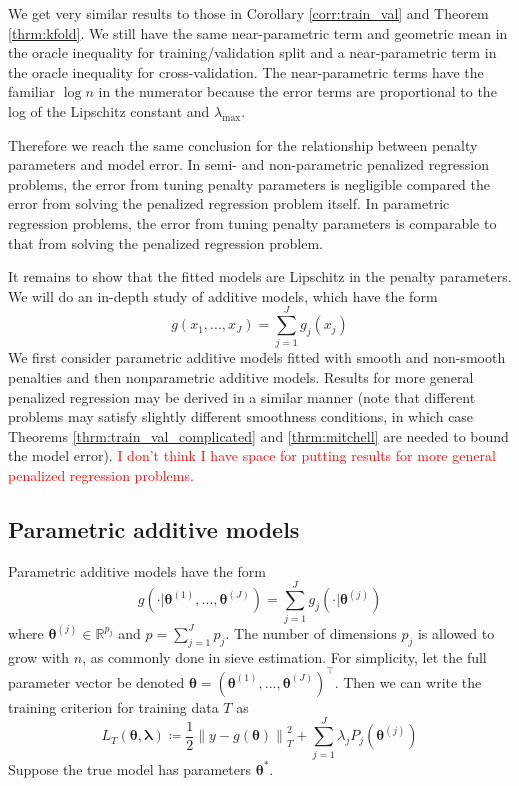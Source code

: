 \documentclass[12pt]{article}
\begin{document}
We get very similar results to those in Corollary \ref{corr:train_val} and Theorem \ref{thrm:kfold}. We still have the same near-parametric term and geometric mean in the oracle inequality for training/validation split and a near-parametric term in the oracle inequality for cross-validation. The near-parametric terms have the familiar $\log n$ in the numerator because the error terms are proportional to the log of the Lipschitz constant and $\lambda_{\max}$. 

Therefore we reach the same conclusion for the relationship between penalty parameters and model error. In semi- and non-parametric penalized regression problems, the error from tuning penalty parameters is negligible compared the error from solving the penalized regression problem itself. In parametric regression problems, the error from tuning penalty parameters is comparable to that from solving the penalized regression problem.

It remains to show that the fitted models are Lipschitz in the penalty parameters. We will do an in-depth study of additive models, which have the form
\begin{equation}
g(x_1, ..., x_J)= \sum_{j=1}^J g_j(x_j)
\end{equation}
We first consider parametric additive models fitted with smooth and non-smooth penalties and then nonparametric additive models. Results for more general penalized regression may be derived in a similar manner (note that different problems may satisfy slightly different smoothness conditions, in which case Theorems \ref{thrm:train_val_complicated} and \ref{thrm:mitchell} are needed to bound the model error). \textcolor{red}{I don't think I have space for putting results for more general penalized regression problems.}

\subsection{Parametric additive models}
\label{sec:param_add_models}
Parametric additive models have the form
\begin{equation}
g(\cdot | \boldsymbol{\theta}^{(1)}, ..., \boldsymbol{\theta}^{(J)}) = \sum_{j=1}^J g_j(\cdot | \boldsymbol{\theta}^{(j)})
\end{equation}
where $\boldsymbol{\theta}^{(j)} \in \mathbb{R}^{p_j}$ and $p = \sum_{j=1}^J p_j$. The number of dimensions $p_j$ is allowed to grow with $n$, as commonly done in sieve estimation. For simplicity, let the full parameter vector be denoted $\boldsymbol{\theta} = \left (\boldsymbol{\theta}^{(1)}, ..., \boldsymbol{\theta}^{(J)} \right )^\top$. Then we can write the training criterion for training data $T$ as
\begin{equation}
\label{eq:param_add}
L_T \left (\boldsymbol{\theta}, \boldsymbol{\lambda} \right) 
\coloneqq \frac{1}{2} \left  \| y -  g(\boldsymbol{\theta}) \right \|^2_T 
+ \sum_{j=1}^J \lambda_j P_j(\boldsymbol{\theta}^{(j)})
\end{equation}
Suppose the true model has parameters $\boldsymbol{\theta}^*$.
\end{document}
